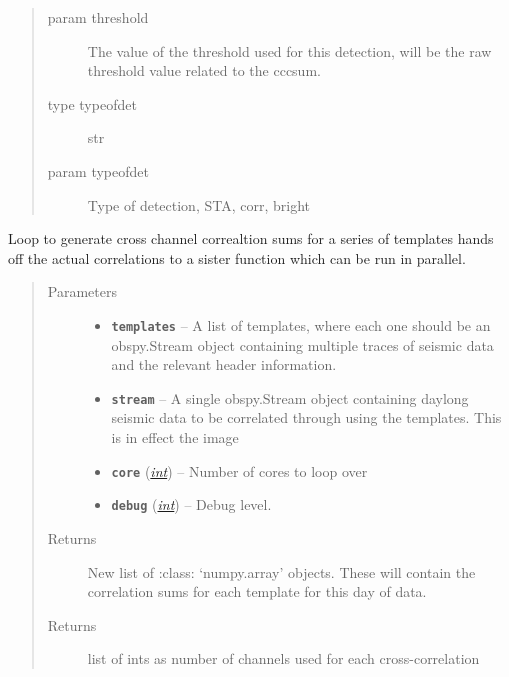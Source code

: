 \documentclass[a4paper,10pt,english]{sphinxmanual}
\begin{document}
\begin{fulllineitems}
\begin{description}
\begin{quote}
\begin{description}
\item[{param threshold}] \leavevmode
The value of the threshold used for this detection,        will be the raw threshold value related to the cccsum.

\item[{type typeofdet}] \leavevmode
str

\item[{param typeofdet}] \leavevmode
Type of detection, STA, corr, bright

\end{description}\end{quote}

\end{description}

\end{fulllineitems}


\begin{fulllineitems}
\label{core:match_filter._channel_loop}
Loop to generate cross channel correaltion sums for a series of templates
hands off the actual correlations to a sister function which can be run in
parallel.
\begin{quote}\begin{description}
\item[{Parameters}] \leavevmode\begin{itemize}
\item {} 
\textbf{\texttt{templates}} -- A list of templates, where each one should be an    obspy.Stream object containing multiple traces of seismic data and the    relevant header information.

\item {} 
\textbf{\texttt{stream}} -- A single obspy.Stream object containing daylong seismic data    to be correlated through using the templates.  This is in effect the image

\item {} 
\textbf{\texttt{core}} (\href{https://docs.python.org/library/functions.html\#int}{\emph{int}}) -- Number of cores to loop over

\item {} 
\textbf{\texttt{debug}} (\href{https://docs.python.org/library/functions.html\#int}{\emph{int}}) -- Debug level.

\end{itemize}

\item[{Returns}] \leavevmode
New list of :class: `numpy.array' objects.  These will contain the    correlation sums for each template for this day of data.

\item[{Returns}] \leavevmode
list of ints as number of channels used for each cross-correlation

\end{description}\end{quote}

\end{fulllineitems}
\end{document}
